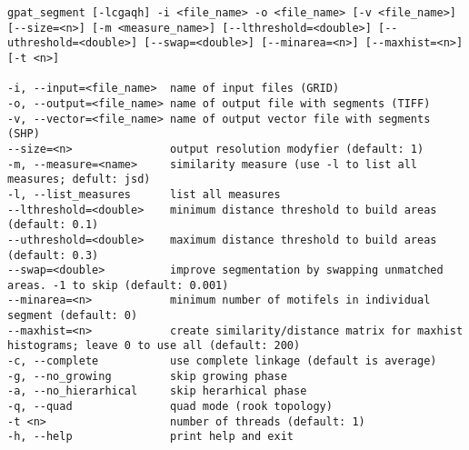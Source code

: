 \begin{minipage}{\linewidth}
\begin{lstlisting}
gpat_segment [-lcgaqh] -i <file_name> -o <file_name> [-v <file_name>] [--size=<n>] [-m <measure_name>] [--lthreshold=<double>] [--uthreshold=<double>] [--swap=<double>] [--minarea=<n>] [--maxhist=<n>] [-t <n>]

-i, --input=<file_name>  name of input files (GRID)
-o, --output=<file_name> name of output file with segments (TIFF)
-v, --vector=<file_name> name of output vector file with segments (SHP)
--size=<n>               output resolution modyfier (default: 1)
-m, --measure=<name>     similarity measure (use -l to list all measures; defult: jsd)
-l, --list_measures      list all measures
--lthreshold=<double>    minimum distance threshold to build areas (default: 0.1)
--uthreshold=<double>    maximum distance threshold to build areas (default: 0.3)
--swap=<double>          improve segmentation by swapping unmatched areas. -1 to skip (default: 0.001)
--minarea=<n>            minimum number of motifels in individual segment (default: 0)
--maxhist=<n>            create similarity/distance matrix for maxhist histograms; leave 0 to use all (default: 200)
-c, --complete           use complete linkage (default is average)
-g, --no_growing         skip growing phase
-a, --no_hierarhical     skip herarhical phase
-q, --quad               quad mode (rook topology)
-t <n>                   number of threads (default: 1)
-h, --help               print help and exit
\end{lstlisting}
\end{minipage}
















